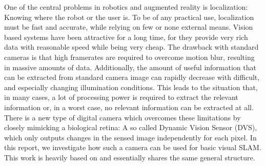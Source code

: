 One of the central problems in robotics and augmented reality is localization:
Knowing where the robot or the user is. To be of any practical use,
localization must be fast and accurate, while relying on few or none external
means.
Vision based systems have been attractive for a long time, for they
provide very rich data with reasonable speed while being very cheap. The
drawback with standard cameras is that high framerates are required to overcome
motion blur, resulting in massive amounts of data. Additionally, the amount of
useful information that can be extracted from standard camera image can rapidly
decrease with difficult, and especially changing illumination conditions. This
leads to the situation that, in many cases, a lot of processing power is
required to extract the relevant information or, in a worst case, no relevant
information can be extracted at all.  There is a new type of digital camera
which overcomes these limitations by closely mimicking a biological retina: A so
called Dynamic Vision Sensor (DVS), which only outputs changes in the sensed
image independently for each pixel.  In this report, we investigate how such a
camera can be used for basic visual SLAM.  This work is heavily based on
\cite{kim2014simultaneous} and essentially shares the same general structure.
